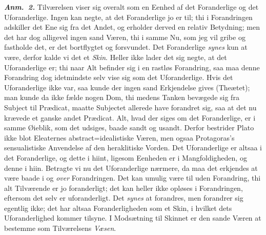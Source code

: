 \documentclass[12pt]{book}
\newcommand{\anm}[1]{\emph{\textbf{Anm.~#1.}}}
\newcommand{\opage}[1]{\marginnote{\footnotesize\textit{[#1]}}}
\begin{document}
\anm{2} Tilværelsen viser sig overalt som en Eenhed af det Foranderlige og det
Uforanderlige. Ingen kan negte,
\opage{119} %
at det Foranderlige jo er til; thi i Forandringen adskiller det Ene sig fra det Andet,
og erholder derved en relativ Betydning; men det har dog alligevel ingen sand Væren,
thi i samme Nu, som jeg vil gribe og fastholde det, er det bortflygtet og forsvundet.
Det Foranderlige \emph{synes} kun at være, derfor kalde vi det et \emph{Skin}. Heller
ikke lader det sig negte, at det Uforanderlige er; thi naar Alt befinder sig i en
rastløs Forandring, saa maa denne Forandring dog idetmindste selv vise sig som det
Uforanderlige. Hvis det Uforanderlige ikke var, saa kunde der ingen sand Erkjendelse
gives (Theætet); man kunde da ikke fælde nogen Dom, thi medens Tanken bevægede sig fra
Subject til Prædicat, maatte Subjectet allerede have forandret sig, saa at det nu
krævede et ganske andet Prædicat. Alt, hvad der siges om det Foranderlige, er i samme
Øieblik, som det udsiges, baade sandt og usandt. Derfor bestrider Plato ikke blot
Eleaternes abstract=idealistiske Væren, men ogsaa Protagoras's sensualistiske
Anvendelse af den heraklitiske Vorden. Det Uforanderlige er altsaa i det Foranderlige,
og dette i hiint, ligesom Eenheden er i Mangfoldigheden, og denne i hiin. Betragte vi
nu det Uforanderlige nærmere, da maa det erkjendes at være baade i og \emph{over}
Forandringen. Det kan umulig være til uden Forandring, thi alt Tilværende er jo
foranderligt; det kan heller ikke opløses i Forandringen, eftersom det selv er
uforanderligt. Det \emph{synes} at forandres, men forandrer sig egentlig ikke; det har
altsaa Foranderligheden som et Skin, i hvilket dets Uforanderlighed kommer tilsyne. I
Modsætning til Skinnet er den sande Væren at bestemme som Tilværelsens \emph{Væsen}.
\end{document}
